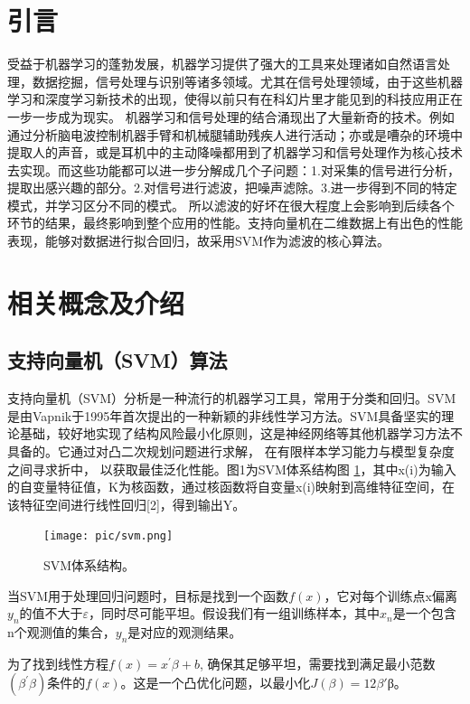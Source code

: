 \section{引言}
受益于机器学习的蓬勃发展，机器学习提供了强大的工具来处理诸如自然语言处理，数据挖掘，信号处理与识别等诸多领域。尤其在信号处理领域，由于这些机器学习和深度学习新技术的出现，使得以前只有在科幻片里才能见到的科技应用正在一步一步成为现实。
机器学习和信号处理的结合涌现出了大量新奇的技术。例如通过分析脑电波控制机器手臂和机械腿辅助残疾人进行活动；亦或是嘈杂的环境中提取人的声音，或是耳机中的主动降噪都用到了机器学习和信号处理作为核心技术去实现。而这些功能都可以进一步分解成几个子问题：1.对采集的信号进行分析，提取出感兴趣的部分。2.对信号进行滤波，把噪声滤除。3.进一步得到不同的特定模式，并学习区分不同的模式。
所以滤波的好坏在很大程度上会影响到后续各个环节的结果，最终影响到整个应用的性能。支持向量机在二维数据上有出色的性能表现，能够对数据进行拟合回归，故采用SVM作为滤波的核心算法。
\section{相关概念及介绍}
\subsection{支持向量机（SVM）算法}
支持向量机（SVM）分析是一种流行的机器学习工具，常用于分类和回归。SVM是由Vapnik于1995年首次提出的一种新颖的非线性学习方法。SVM具备坚实的理论基础，较好地实现了结构风险最小化原则，这是神经网络等其他机器学习方法不具备的。它通过对凸二次规划问题进行求解， 在有限样本学习能力与模型复杂度之间寻求折中， 以获取最佳泛化性能。图1为SVM体系结构图 \ref{fig:SVM}，其中x(i)为输入的自变量特征值，K为核函数，通过核函数将自变量x(i)映射到高维特征空间，在该特征空间进行线性回归[2]，得到输出Y。
\begin{figure}[!htbp]
    \centering
    \texttt{[image: pic/svm.png]}%
    \caption{SVM体系结构。}
    \label{fig:SVM}
\end{figure}

当SVM用于处理回归问题时，目标是找到一个函数$f\left ( x \right )$，它对每个训练点x偏离$y_n$的值不大于$\varepsilon$，同时尽可能平坦。假设我们有一组训练样本，其中$x_n$是一个包含n个观测值的集合，$y_n$是对应的观测结果。

为了找到线性方程$f(x)=x^\prime\beta+b$, 确保其足够平坦，需要找到满足最小范数$\left(\beta^\prime\beta\right)$条件的$f(x)$。这是一个凸优化问题，以最小化$J(β)=12β′$β。

